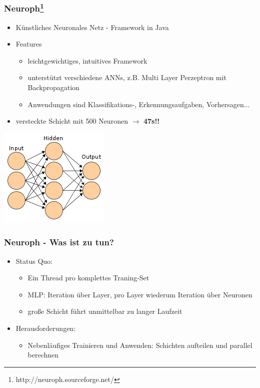 \documentclass[24pt]{beamer}
\begin{document}
	\begin{frame}[c]\frametitle{Neuroph\footnote{http://neuroph.sourceforge.net/}}
		\begin{itemize}
			\item Künstliches Neuronales Netz - Framework in Java
			\item Features
			\begin {itemize}
				\item leichtgewichtiges, intuitives Framework
				\item unterstützt verschiedene ANNs, z.B. Multi Layer Perzeptron mit Backpropagation
				\item Anwendungen sind Klassifikations-, Erkennungsaufgaben, Vorhersagen...
			\end {itemize}
			\item versteckte Schicht mit 500 Neuronen $\rightarrow$ \textbf{47s!!}
		\end {itemize}
		\includegraphics[scale=0.5]{ann.png}
	\end {frame}
	
	\begin{frame}[c]\frametitle{Neuroph - Was ist zu tun?}
		\begin{itemize}
			\item Status Quo:
		    \begin{itemize}
		    	\item Ein Thread pro komplettes Traning-Set
		    	\item MLP: Iteration über Layer, pro Layer wiederum Iteration über Neuronen
		    	\item große Schicht führt unmittelbar zu langer Laufzeit
		    \end{itemize}
		    \item Herausforderungen:
		    \begin{itemize}
		    	\item Nebenläufiges Trainieren und Anwenden: Schichten aufteilen und parallel berechnen
		    \end{itemize}
		\end{itemize}
	\end{frame}
\end{document}
